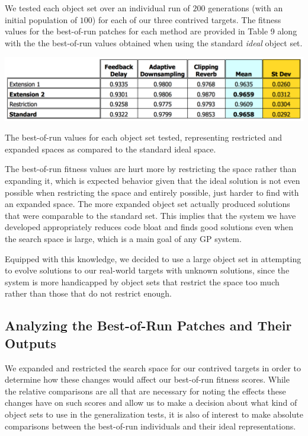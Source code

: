 \documentclass[12pt]{report} 	%
\numberwithin{figure}{chapter}
\numberwithin{table}{chapter}
\numberwithin{equation}{chapter}
\begin{document}
\begin{flushleft}
We tested each object set over an individual run of $200$ generations (with an initial population of $100$) for each of our three contrived targets. The fitness values for the best-of-run patches for each method are provided in Table 9 along with the the best-of-run values obtained when using the standard \textit{ideal} object set.
\begin{table}[h!]
\vspace{30pt}
\begin{center}
\includegraphics[scale=0.6,width=\linewidth]{ExpansionRestrictionTable}
\caption[Restriction/expansion best-of-run values]{The best-of-run values for each object set tested, representing restricted and expanded spaces as compared to the standard ideal space.}
\end{center}
\vspace{6pt}
\end{table}

The best-of-run fitness values are hurt more by restricting the space rather than expanding it, which is expected behavior given that the ideal solution is not even possible when restricting the space and entirely possible, just harder to find with an expanded space. The more expanded object set actually produced solutions that were comparable to the standard set. This implies that the system we have developed appropriately reduces code bloat and finds good solutions even when the search space is large, which is a main goal of any GP system. 

Equipped with this knowledge, we decided to use a large object set in attempting to evolve solutions to our real-world targets with unknown solutions, since the system is more handicapped by object sets that restrict the space too much rather than those that do not restrict enough.

\vspace{12pt}
\subsection{Analyzing the Best-of-Run Patches and Their Outputs}
We expanded and restricted the search space for our contrived targets in order to determine how these changes would affect our best-of-run fitness scores. While the relative comparisons are all that are necessary for noting the effects these changes have on such scores and allow us to make a decision about what kind of object sets to use in the generalization tests, it is also of interest to make absolute comparisons between the best-of-run individuals and their ideal representations. 


\end{flushleft}
\end{document}
